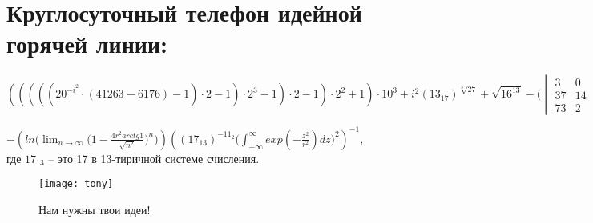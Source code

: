 \section*{Круглосуточный телефон идейной горячей линии:}
$(((((20^{-i^2}\cdot (41263-6176)-1)\cdot 2-1)\cdot 2^3 -1)\cdot 2-1)\cdot 2^2 +1)\cdot 10^3 + i^2(13_{17})^{\sqrt[3]{27}} +\sqrt{16^{13}}  -\Bigg( 
\begin{vmatrix}{}
3 & 0 & 0 \\
37 & 14 & 7 \\
73 & 2 & 17
\end{vmatrix}
 -1 \Bigg)\cdot 10^5 +
\begin{vmatrix}{}
14 & 5 & 10 \\
0 & 0 & 1 \\
3 & 8 & 69
\end{vmatrix}
- (2-33)(17-48) + \cos^{11}(2\arccos(\sqrt{\frac{11}{2}}))  +e^{-i\frac{\pi}{2}}\sqrt{9191 -(7\cdot 20^3+7\cdot 10^2) + 3\cdot (-5)}  -9,99329\cdot 10^{10}\cdot \bigg(\frac{\partial sin(xy)}{\partial y}\bigg)_{x=1,y=0}-$


  $-
(ln\big(\lim_{n \rightarrow \infty}\big(1-\frac{4r^2 arctg 1}{\sqrt{n^2}} \big)^n\big))((17_{13})^{-11_2}\big(\int_{-\infty}^{\infty}exp(-\frac{z^2}{r^2})dz \big)^2)^{-1}, $\\




где $17_{13}$ -- это 17 в 13-тиричной системе счисления.

\begin{figure}[ht!]
    \centering
    \texttt{[image: tony]}
    \caption{Нам нужны твои идеи!}
\end{figure}
